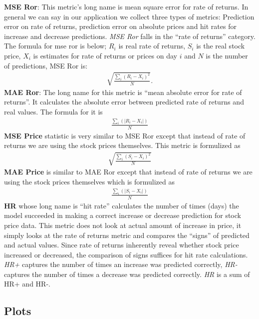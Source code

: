 \textbf{MSE Ror}: This metric's long name is mean square error for rate of
returns. In general we can say in our application we collect three types of
metrics: Prediction error on rate of returns, prediction error on absolute
prices and hit rates for increase and decrease predictions. {\em MSE Ror} falls
in the ``rate of returns'' category.  The formula for mse ror is below; $R_i$ is
real rate of returns, $S_i$ is the real stock price, $X_i$ is estimates for rate
of returns or prices on day $i$ and $N$ is the number of predictions, MSE Ror
is:
\begin{eqnarray}
\sqrt{\frac{\sum_i (R_i - X_i)^2}{N}}. 
\end{eqnarray}
\textbf{MAE Ror}: The long name for this metric is ``mean absolute error for
rate of returns''. It calculates the absolute error between predicted rate of
returns and real values. The formula for it is 
\begin{eqnarray}
\frac{\sum_i (|R_i - X_i|)}{N}
\end{eqnarray}
\textbf{MSE Price} statistic is very similar to MSE Ror except that instead of
rate of returns we are using the stock prices themselves. This metric is
formulized as 
\begin{eqnarray}
\sqrt{\frac{\sum_i (S_i - X_i)^2}{N}}
\end{eqnarray}
\textbf{MAE Price} is similar to MAE Ror except that instead of rate of returns
we are using the stock prices themselves which is formulized as
\begin{eqnarray}
\frac{\sum_i (|S_i - X_i|)}{N}
\end{eqnarray}
\textbf{HR} whose long name is ``hit rate'' calculates the number of times
(days) the model succeeded in making a correct increase or decrease prediction
for stock price data. This metric does not look at actual amount of increase in
price, it simply looks at the rate of returns metric and compares the ``signs''
of predicted and actual values. Since rate of returns inherently reveal whether
stock price increased or decreased, the comparison of signs suffices for hit
rate calculations. {\em HR+} captures the number of times an increase was
predicted correctly, {\em HR-} captures the number of times a decrease was
predicted correctly. {\em HR} is a sum of HR+ and HR-.

\subsection{Plots}

